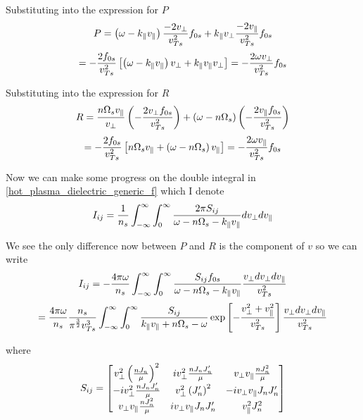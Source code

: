 Substituting into the expression for $P$
\begin{equation*}
	P = \left( \omega - k_\parallel v_\parallel \right) \frac{-2v_\perp}{v_{Ts}^2} f_{0s} + k_\parallel v_\perp \frac{-2v_\parallel}{v_{Ts}^2} f_{0s}
\end{equation*}
\begin{equation}
	= -\frac{2f_{0s}}{v_{Ts}^2} \left[ \left( \omega - k_\parallel v_\parallel \right) v_\perp + k_\parallel v_\parallel v_\perp \right] = -\frac{2 \omega v_\perp}{v_{Ts}^2} f_{0s}
\end{equation}

Substituting into the expression for $R$
\begin{equation*}
	R = \frac{n \Omega_s v_\parallel}{v_\perp} \left( - \frac{2 v_\perp f_{0s}}{v_{Ts}^2} \right) + \left( \omega - n \Omega_s \right) \left( - \frac{2 v_\parallel f_{0s}}{v_{Ts}^2} \right)
\end{equation*}
\begin{equation}
	= - \frac{2 f_{0s}}{v_{Ts}^2} \left[ n \Omega_s v_\parallel + \left( \omega - n \Omega_s \right) v_\parallel \right] = -\frac{2 \omega v_\parallel}{v_{Ts}^2} f_{0s}
\end{equation}

Now we can make some progress on the double integral in \eqref{hot_plasma_dielectric_generic_f} which I denote
\begin{equation}
	I_{ij} = \frac{1}{n_s} \int_{-\infty}^\infty \int_0^\infty \frac{2\pi S_{ij}}{\omega-n\Omega_s-k_\parallel v_\parallel} dv_\perp dv_\parallel
\end{equation}

We see the only difference now between $P$ and $R$ is the component of $v$ so we can write
\begin{equation*}
	I_{ij} = - \frac{4 \pi \omega}{n_s} \int_{-\infty}^\infty \int_0^\infty \frac{S_{ij} f_{0s}}{\omega - n\Omega_s - k_\parallel v_\parallel} \frac{v_\perp dv_\perp dv_\parallel}{v_{Ts}^2}
\end{equation*}
\begin{equation}
	= \frac{4 \pi \omega}{n_s} \frac{n_s}{\pi^{\frac{3}{2}}v_{Ts}^3} \int_{-\infty}^\infty \int_0^\infty \frac{S_{ij}}{k_\parallel v_\parallel + n\Omega_s - \omega} \exp \left[ - \frac{v_\perp^2 + v_\parallel^2}{v_{Ts}^2} \right] \frac{v_\perp dv_\perp dv_\parallel}{v_{Ts}^2}
\end{equation}

where
\begin{equation}
	S_{ij} =
	\begin{bmatrix}
		v_\perp^2 \left(\frac{nJ_n}{\mu}\right)^2 & iv_\perp^2 \frac{nJ_nJ_n'}{\mu} & v_\perp v_\parallel \frac{nJ_n^2}{\mu}\\
		- iv_\perp^2 \frac{nJ_nJ_n'}{\mu} & v_\perp^2 \left(J_n'\right)^2 & -i v_\perp v_\parallel J_n J_n'\\
		v_\perp v_\parallel \frac{nJ_n^2}{\mu}  & i v_\perp v_\parallel J_n J_n' & v_\parallel^2 J_n^2\\
	\end{bmatrix}
\end{equation}

